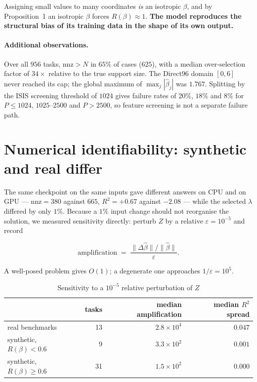 \documentclass[11pt]{article}
\newcommand{\Rq}{R(\beta)}
\newcommand{\bhat}{\hat{\beta}}
\begin{document}
Assigning small values to many coordinates \emph{is} an isotropic $\beta$,
and by Proposition~1 an isotropic $\beta$ forces $\Rq \approx 1$.
\textbf{The model reproduces the structural bias of its training data in the
shape of its own output.}

\paragraph{Additional observations.}
Over all $956$ tasks, $\mathrm{nnz} > N$ in $65\%$ of cases ($625$), with a
median over-selection factor of $34\times$ relative to the true support size.
The Direct96 domain $[0,6]$ never reached its cap; the global maximum of
$\max_j|\bhat_j|$ was $1.767$. Splitting by the ISIS screening threshold of
$1024$ gives failure rates of $20\%$, $18\%$ and $8\%$ for
$P \le 1024$, $1025$--$2500$ and $P > 2500$, so feature screening is not a
separate failure path.

\section{Numerical identifiability: synthetic and real differ}
\label{sec:stability}

The same checkpoint on the same inputs gave different answers on CPU and on
GPU --- $\mathrm{nnz} = 380$ against $665$, $R^2 = +0.67$ against $-2.08$ ---
while the selected $\lambda$ differed by only $1\%$. Because a $1\%$ input
change should not reorganise the solution, we measured sensitivity directly:
perturb $Z$ by a relative $\varepsilon = 10^{-5}$ and record

\begin{equation}
\text{amplification} \;=\; \frac{\|\Delta\bhat\| / \|\bhat\|}{\varepsilon} .
\end{equation}

A well-posed problem gives $O(1)$; a degenerate one approaches
$1/\varepsilon = 10^5$.

\begin{table}[h]
\centering
\caption{Sensitivity to a $10^{-5}$ relative perturbation of $Z$}
\begin{tabular}{@{}lrrr@{}}
\toprule
 & tasks & median amplification & median $R^2$ spread \\
\midrule
real benchmarks       & 13 & $2.8 \times 10^{4}$ & $0.047$ \\
synthetic, $\Rq < 0.6$ &  9 & $3.3 \times 10^{2}$ & $0.001$ \\
synthetic, $\Rq \ge 0.6$ & 31 & $1.5 \times 10^{2}$ & $0.000$ \\
\bottomrule
\end{tabular}
\end{table}
\end{document}

